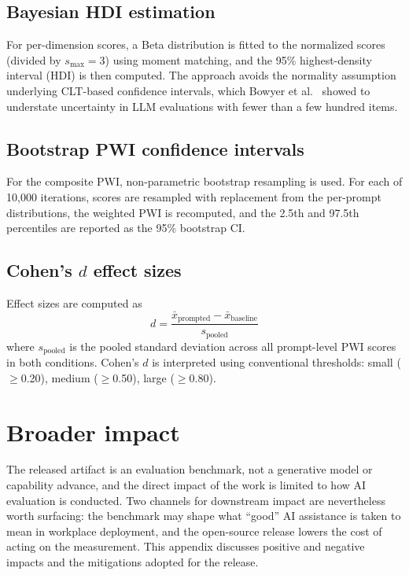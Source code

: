 \documentclass{article}
\begin{document}
\subsection{Bayesian HDI estimation}
For per-dimension scores, a Beta distribution is fitted to the normalized scores (divided by $s_{\max} = 3$) using moment matching, and the 95\% highest-density interval (HDI) is then computed. The approach avoids the normality assumption underlying CLT-based confidence intervals, which Bowyer et al.\ \cite{bowyer2025clt} showed to understate uncertainty in LLM evaluations with fewer than a few hundred items.

\subsection{Bootstrap PWI confidence intervals}
For the composite PWI, non-parametric bootstrap resampling is used. For each of 10,000 iterations, scores are resampled with replacement from the per-prompt distributions, the weighted PWI is recomputed, and the 2.5th and 97.5th percentiles are reported as the 95\% bootstrap CI.

\subsection{Cohen's $d$ effect sizes}
Effect sizes are computed as
\begin{equation}
d = \frac{\bar{x}_{\text{prompted}} - \bar{x}_{\text{baseline}}}{s_{\text{pooled}}}
\end{equation}
where $s_{\text{pooled}}$ is the pooled standard deviation across all prompt-level PWI scores in both conditions. Cohen's $d$ is interpreted using conventional thresholds: small ($\geq$0.20), medium ($\geq$0.50), large ($\geq$0.80).


\section{Broader impact}
\label{app:broader_impact}

The released artifact is an evaluation benchmark, not a generative model or capability advance, and the direct impact of the work is limited to how AI evaluation is conducted. Two channels for downstream impact are nevertheless worth surfacing: the benchmark may shape what ``good'' AI assistance is taken to mean in workplace deployment, and the open-source release lowers the cost of acting on the measurement. This appendix discusses positive and negative impacts and the mitigations adopted for the release.
\end{document}
